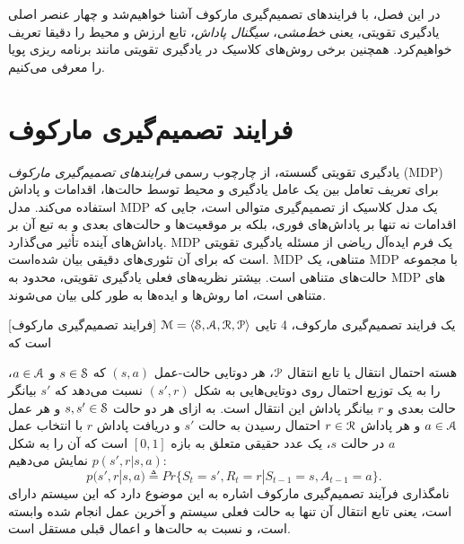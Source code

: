 
  در این فصل، با فرایندهای تصمیم‌گیری مارکوف آشنا خواهیم‌شد و چهار عنصر اصلی یادگیری تقویتی، یعنی \textit{خط‌مشی}، \textit{سیگنال پاداش}، تابع ارزش و محیط را دقیقا تعریف خواهیم‌کرد. همچنین برخی روش‌های کلاسیک در یادگیری تقویتی مانند برنامه ریزی پویا را معرفی می‌کنیم.



\section{فرایند تصمیم‌گیری مارکوف}

یادگیری تقویتی گسسته، از چارچوب رسمی \textit{فرایندهای تصمیم‌گیری مارکوف} 
 (MDP)
 برای تعریف تعامل بین یک عامل یادگیری و محیط توسط حالت‌ها، اقدامات و پاداش استفاده می‌کند. مدل MDP یک مدل کلاسیک از تصمیم‌گیری متوالی است، جایی که اقدامات نه تنها بر پاداش‌های فوری، بلکه بر موقعیت‌ها و حالت‌های بعدی و به تبع آن بر پاداش‌های آینده تأثیر می‌گذارد.
MDP
 یک فرم ایده‌آل ریاضی از مسئله یادگیری تقویتی است که برای آن تئوری‌های دقیقی بیان شده‌است.
MDP متناهی،
 یک MDP با مجموعه حالت‌های متناهی است. 
بیشتر نظریه‌های فعلی یادگیری تقویتی، محدود به MDP  های متناهی است، اما روش‌ها و ایده‌ها به طور کلی بیان می‌شوند.


[فرایند تصمیم‌گیری مارکوف] 
یک فرایند تصمیم‌گیری مارکوف، 4 تایی 
$\EuScript{M} = \left< \EuScript{S},\EuScript{A},\EuScript{R},\EuScript{P} \right>$
است که


هسته احتمال انتقال یا تابع انتقال $\EuScript{P}$، هر دوتایی حالت-عمل
$(s,a)$ که 
$s \in \EuScript{S}$
و
$a \in \EuScript{A}$، را به یک توزیع احتمال روی دوتایی‌هایی به شکل 
$(s',r)$
نسبت می‌دهد که $s'$ بیانگر حالت بعدی و $r$ بیانگر پاداش این انتقال است. به ازای هر دو حالت 
$s,s' \in \EuScript{S}$
 و هر عمل 
 $a \in \EuScript{A}$
  و هر پاداش 
  $r \in \EuScript{R}$
  احتمال رسیدن به حالت $s'$ و دریافت پاداش $r$ با انتخاب عمل $a$ در حالت $s$، یک عدد حقیقی متعلق به  بازه $[0,1]$ است که آن را به شکل
$p(s',r|s,a)$
نمایش می‌دهیم:
$$p(s',r|s,a) \triangleq Pr\{S_t=s',R_t=r|S_{t-1}=s,A_{t-1}=a\}.$$ 
نام\nf گذاری فرآیند تصمیم‌گیری مارکوف اشاره به این موضوع دارد که این سیستم‌ دارای   است، یعنی تابع انتقال آن تنها به حالت فعلی سیستم و آخرین عمل انجام شده وابسته است، و نسبت به حالت‌ها و اعمال قبلی مستقل است.

